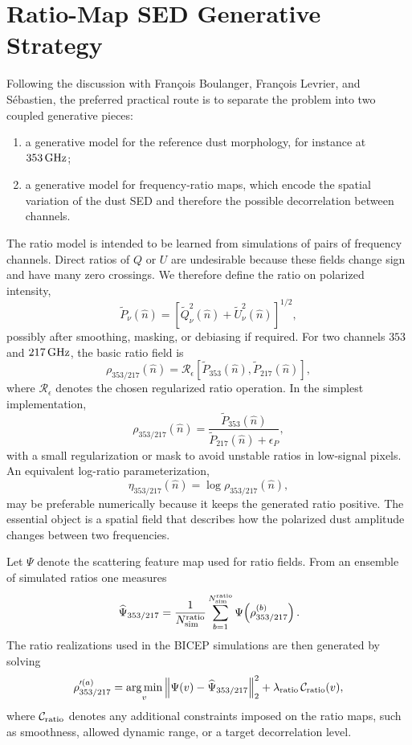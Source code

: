 \documentclass[11pt]{article}
\begin{document}
\section{Ratio-Map SED Generative Strategy}

Following the discussion with Fran\c{c}ois Boulanger, Fran\c{c}ois Levrier,
and S\'ebastien, the preferred practical route is to separate the problem into
two coupled generative pieces:
\begin{enumerate}[label=(R\arabic*)]
  \item a generative model for the reference dust morphology, for instance at
  $353\,{\rm GHz}$;

  \item a generative model for frequency-ratio maps, which encode the spatial
  variation of the dust SED and therefore the possible decorrelation between
  channels.
\end{enumerate}
The ratio model is intended to be learned from simulations of pairs of
frequency channels.  Direct ratios of $Q$ or $U$ are undesirable because these
fields change sign and have many zero crossings.  We therefore define the
ratio on polarized intensity,
\[
  \tilde P_\nu(\hat n)
  =
  \left[
    \tilde Q_\nu^2(\hat n)
    +
    \tilde U_\nu^2(\hat n)
  \right]^{1/2},
\]
possibly after smoothing, masking, or debiasing if required.  For two
channels $353$ and $217\,{\rm GHz}$, the basic ratio field is
\[
  \rho_{353/217}(\hat n)
  =
  \mathcal R_\epsilon
  \left[
    \tilde P_{353}(\hat n),
    \tilde P_{217}(\hat n)
  \right],
\]
where $\mathcal R_\epsilon$ denotes the chosen regularized ratio operation.
In the simplest implementation,
\[
  \rho_{353/217}(\hat n)
  =
  \frac{
    \tilde P_{353}(\hat n)
  }{
    \tilde P_{217}(\hat n)+\epsilon_P
  },
\]
with a small regularization or mask to avoid unstable ratios in low-signal
pixels.  An equivalent log-ratio parameterization,
\[
  \eta_{353/217}(\hat n)
  =
  \log \rho_{353/217}(\hat n),
\]
may be preferable numerically because it keeps the generated ratio positive.
The essential object is a spatial field that describes how the polarized dust
amplitude changes between two frequencies.

Let $\Psi$ denote the scattering feature map used for ratio fields.  From an
ensemble of simulated ratios one measures
\[
  \widehat\Psi_{353/217}
  =
  \frac{1}{N_{\rm sim}^{\rm ratio}}
  \sum_{b=1}^{N_{\rm sim}^{\rm ratio}}
  \Psi\!\left(\rho_{353/217}^{(b)}\right).
\]
The ratio realizations used in the BICEP simulations are then generated by
solving
\[
  \rho_{353/217}^{\prime(a)}
  =
  \operatorname*{arg\,min}_{v}
  \left\|
    \Psi(v)
    -
    \widehat\Psi_{353/217}
  \right\|_2^2
  +
  \lambda_{\rm ratio}
  \,\mathcal C_{\rm ratio}(v),
\]
where $\mathcal C_{\rm ratio}$ denotes any additional constraints imposed on
the ratio maps, such as smoothness, allowed dynamic range, or a target
decorrelation level.
\end{document}
